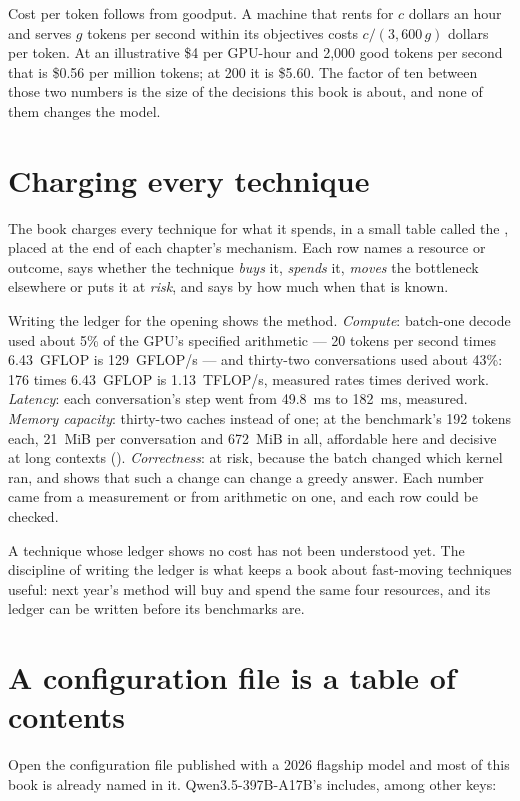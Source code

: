 Cost per token follows from goodput. A machine that rents for $c$ dollars an
hour and serves $g$ tokens per second within its objectives costs
$c / (3{,}600\,g)$ dollars per token. At an illustrative \$4 per GPU-hour and
2,000 good tokens per second that is \$0.56 per million tokens; at 200 it is
\$5.60. The factor of ten between those two numbers is the size of the
decisions this book is about, and none of them changes the model.

\section{Charging every technique}

The book charges every technique for what it spends, in a small table called
the , placed at the end of each chapter's mechanism.
Each row names a resource or outcome, says whether the technique \emph{buys}
it, \emph{spends} it, \emph{moves} the bottleneck elsewhere or puts it at
\emph{risk}, and says by how much when that is known.

Writing the ledger for the opening shows the method. \emph{Compute}: batch-one
decode used about 5\% of the GPU's specified arithmetic --- 20 tokens per second
times 6.43~GFLOP is 129~GFLOP/s --- and thirty-two conversations used about
43\%: 176 times 6.43~GFLOP is 1.13~TFLOP/s, measured rates times derived work.
\emph{Latency}: each conversation's step went from 49.8~ms to 182~ms, measured.
\emph{Memory capacity}: thirty-two caches instead of one; at the benchmark's
192 tokens each, 21~MiB per conversation and 672~MiB in all, affordable here and
decisive at long contexts (). \emph{Correctness}: at risk, because the batch changed which
kernel ran, and  shows that such a change can change
a greedy answer. Each number came from a measurement or from arithmetic on one,
and each row could be checked.

A technique whose ledger shows no cost has not been understood yet. The
discipline of writing the ledger is what keeps a book about fast-moving
techniques useful: next year's method will buy and spend the same four
resources, and its ledger can be written before its benchmarks are.

\section{A configuration file is a table of contents}

Open the configuration file published with a 2026 flagship model and most of
this book is already named in it. Qwen3.5-397B-A17B's \cite{qwen2026qwen35config}
includes, among other keys:

